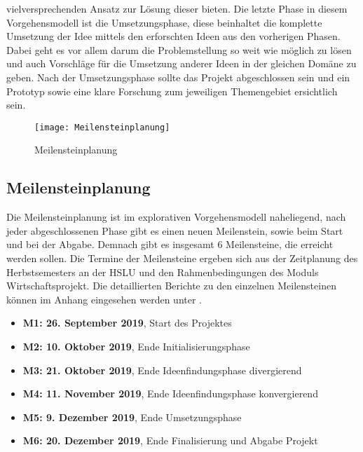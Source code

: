 vielversprechenden Ansatz zur Lösung dieser bieten.
\newline
\newline
Die letzte Phase in diesem Vorgehensmodell ist die Umsetzungsphase, diese beinhaltet die komplette Umsetzung der Idee
mittels den erforschten Ideen aus den vorherigen Phasen. Dabei geht es vor allem darum die Problemstellung so weit wie
möglich zu lösen und auch Vorschläge für die Umsetzung anderer Ideen in der gleichen Domäne zu geben. Nach der
Umsetzungsphase sollte das Projekt abgeschlossen sein und ein Prototyp sowie eine klare Forschung zum jeweiligen
Themengebiet ersichtlich sein.
\begin{figure}[H]
	\centering
	\texttt{[image: Meilensteinplanung]}
	\caption{Meilensteinplanung}
	\label{fig:Meilensteinplanung}
\end{figure}
\noindent

\subsection{Meilensteinplanung}
\label{sec:Meilensteinplanung}
Die Meilensteinplanung ist im explorativen Vorgehensmodell naheliegend, nach jeder abgeschlossenen Phase gibt es einen
neuen Meilenstein, sowie beim Start und bei der Abgabe. Demnach gibt es insgesamt $ 6 $ Meilensteine, die erreicht
werden sollen. Die Termine der Meilensteine ergeben sich aus der Zeitplanung des Herbstsemesters an der HSLU und den
Rahmenbedingungen des Moduls \flqq Wirtschaftsprojekt\frqq. Die detaillierten Berichte zu den einzelnen Meilensteinen
können im Anhang eingesehen werden unter .
\begin{itemize}
	\setlength\itemsep{0em}
	\item \textbf{M1: 26. September 2019}, Start des Projektes
	\item \textbf{M2: 10. Oktober 2019}, Ende Initialisierungsphase
	\item \textbf{M3: 21. Oktober 2019}, Ende Ideenfindungsphase divergierend
	\item \textbf{M4: 11. November 2019}, Ende Ideenfindungsphase konvergierend
	\item \textbf{M5: 9. Dezember 2019}, Ende Umsetzungsphase
	\item \textbf{M6: 20. Dezember 2019}, Ende Finalisierung und Abgabe Projekt
\end{itemize}

